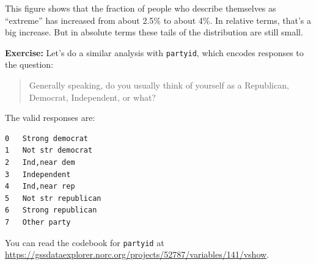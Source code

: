 This figure shows that the fraction of people who describe themselves as
``extreme'' has increased from about 2.5\% to about 4\%. In relative
terms, that's a big increase. But in absolute terms these tails of the
distribution are still small.

\textbf{Exercise:} Let's do a similar analysis with
\passthrough{\lstinline!partyid!}, which encodes responses to the
question:

\begin{quote}
Generally speaking, do you usually think of yourself as a Republican,
Democrat, Independent, or what?
\end{quote}

The valid responses are:

\begin{lstlisting}[style=output]
0   Strong democrat
1   Not str democrat
2   Ind,near dem
3   Independent
4   Ind,near rep
5   Not str republican
6   Strong republican
7   Other party
\end{lstlisting}

You can read the codebook for \passthrough{\lstinline!partyid!} at
\url{https://gssdataexplorer.norc.org/projects/52787/variables/141/vshow}.

